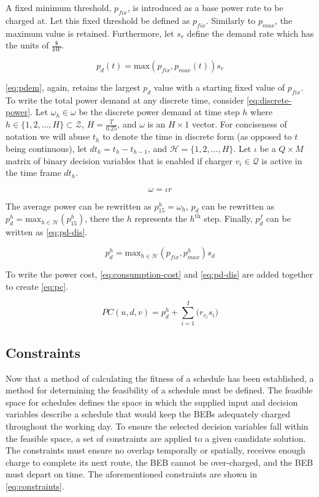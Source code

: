 \documentclass[11pt,a4paper,final]{article}
\newcommand{\PC}{PC(u, d, v)}               %
\newcommand{\Qset}{\mathcal{Q}}             %
\newcommand{\Hset}{\mathcal{H}}             %
\begin{document}
A fixed minimum threshold, \(p_{fix}\), is introduced as a base power rate to be charged at. Let this fixed threshold be
defined as \(p_{fix}\). Similarly to \(p_{max}\), the maximum value is retained. Furthermore, let \(s_r\) define the demand
rate which has the units of \(\frac{\$}{kW}\).

\begin{equation}
\label{eq:pdem}
p_d(t) = \text{max}(p_{fix},p_{max}(t))s_r
\end{equation}

\ref{eq:pdem}, again, retains the largest \(p_{d}\) value with a starting fixed value of \(p_{fix}\). To write the total power
demand at any discrete time, consider \ref{eq:discrete-power}. Let \(\omega_h \in \omega\) be the discrete power demand at time step \(h\)
where \(h \in \{ 1, 2, ..., H \} \subset \mathcal{Z}\), \(H = \frac{T}{0.25}\), and \(\omega\) is an \(H \times 1\) vector. For conciseness of notation we
will abuse \(t_h\) to denote the time in discrete form (as opposed to \(t\) being continuous), let \(dt_h = t_h - t_{h-1}\),
and \(\Hset = \{ 1, 2, ..., H \}\). Let \(\iota\) be a \(Q \times M\) matrix of binary decision variables that is enabled if charger
\(v_i \in \Qset\) is active in the time frame \(dt_h\).

\begin{equation}
\label{eq:discrete-power}
  \omega = \iota r
\end{equation}

The average power can be rewritten as \(p_{15}^h = \omega_h\), \(p_d\) can be rewritten as \(p_d^h = \text{max}_{h \in \Hset}
(p_{15}^{h})\), there the \(h\) represents the \(h^{\text{th}}\) step. Finally, \(p_d^f\) can be written as \ref{eq:pd-dis}.

\begin{equation}
\label{eq:pd-dis}
  p_d^h = \text{max}_{h \in \Hset}(p_{fix}, p_{max}^h)s_d
\end{equation}

To write the power cost, \ref{eq:consumption-cost} and \ref{eq:pd-dis} are added together to create \ref{eq:pc}.

\begin{equation}
\label{eq:pc}
\PC = p^h_d + \sum_{i=1}^I \Big( r_{v_i}s_i \Big)
\end{equation}

\subsection{Constraints}
\label{sec:constraints}
Now that a method of calculating the fitness of a schedule has been established, a method for determining the
feasibility of a schedule must be defined. The feasible space for schedules defines the space in which the supplied
input and decision variables describe a schedule that would keep the BEBs adequately charged throughout the working day.
To ensure the selected decision variables fall within the feasible space, a set of constraints are applied to a given
candidate solution. The constraints must ensure no overlap temporally or spatially, receives enough charge to complete
its next route, the BEB cannot be over-charged, and the BEB must depart on time. The aforementioned constraints are
shown in \ref{eq:constraints}.
\end{document}
